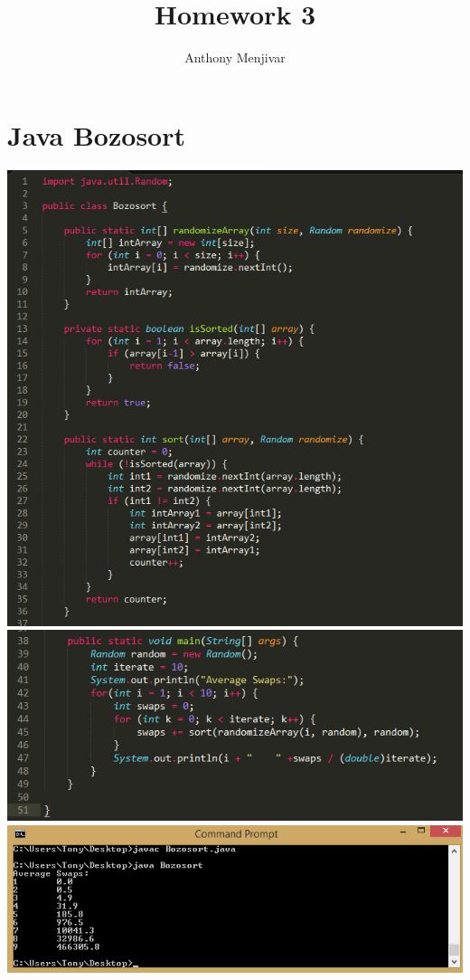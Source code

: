 \documentclass{article}
\title{Homework 3}
\author{Anthony Menjivar}
\date{}
\begin{document}
\maketitle
\section{Java Bozosort}
\begin{center}
\includegraphics{Bozosort1.png}
\includegraphics{Bozosort2.png}
\includegraphics{BozosortTable.png}
\end{center}
\end{document}

